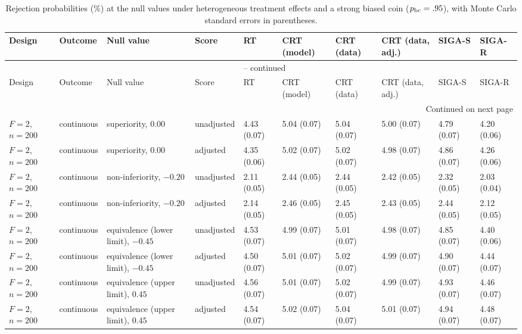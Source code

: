 \clearpage
\begin{landscape}\begin{singlespace}\begingroup\footnotesize\setlength{\tabcolsep}{2pt}\renewcommand{\arraystretch}{1.05}\setlength{\LTleft}{\fill}\setlength{\LTright}{\fill}
\begin{longtable}{@{}llllllllll@{}}
\caption{Rejection probabilities (\%) at the null values under heterogeneous treatment effects and a strong biased coin ($p_{\rm bc}=.95$), with Monte Carlo standard errors in parentheses.}
\label{tab:supp-hetero-null-stress}\\
\toprule
Design & Outcome & Null value & Score & RT & CRT (model) & CRT (data) & CRT (data, adj.) & SIGA-S & SIGA-R\\
\midrule\endfirsthead
\multicolumn{10}{c}{\tablename\ \thetable{} -- continued}\\\toprule
Design & Outcome & Null value & Score & RT & CRT (model) & CRT (data) & CRT (data, adj.) & SIGA-S & SIGA-R\\
\midrule\endhead
\midrule\multicolumn{10}{r}{Continued on next page}\\\endfoot
\bottomrule\endlastfoot
$F=2$, $n=200$ & continuous & superiority, $0.00$ & unadjusted & 4.43 (0.07) & 5.04 (0.07) & 5.04 (0.07) & 5.00 (0.07) & 4.79 (0.07) & 4.20 (0.06)\\
$F=2$, $n=200$ & continuous & superiority, $0.00$ & adjusted & 4.35 (0.06) & 5.02 (0.07) & 5.02 (0.07) & 4.98 (0.07) & 4.86 (0.07) & 4.26 (0.06)\\
$F=2$, $n=200$ & continuous & non-inferiority, $-0.20$ & unadjusted & 2.11 (0.05) & 2.44 (0.05) & 2.44 (0.05) & 2.42 (0.05) & 2.32 (0.05) & 2.03 (0.04)\\
$F=2$, $n=200$ & continuous & non-inferiority, $-0.20$ & adjusted & 2.14 (0.05) & 2.46 (0.05) & 2.45 (0.05) & 2.43 (0.05) & 2.44 (0.05) & 2.12 (0.05)\\
$F=2$, $n=200$ & continuous & equivalence (lower limit), $-0.45$ & unadjusted & 4.53 (0.07) & 4.99 (0.07) & 5.01 (0.07) & 4.98 (0.07) & 4.85 (0.07) & 4.40 (0.06)\\
$F=2$, $n=200$ & continuous & equivalence (lower limit), $-0.45$ & adjusted & 4.50 (0.07) & 5.01 (0.07) & 5.02 (0.07) & 4.99 (0.07) & 4.90 (0.07) & 4.44 (0.07)\\
$F=2$, $n=200$ & continuous & equivalence (upper limit), $0.45$ & unadjusted & 4.56 (0.07) & 5.01 (0.07) & 5.02 (0.07) & 4.99 (0.07) & 4.93 (0.07) & 4.46 (0.07)\\
$F=2$, $n=200$ & continuous & equivalence (upper limit), $0.45$ & adjusted & 4.54 (0.07) & 5.02 (0.07) & 5.04 (0.07) & 5.01 (0.07) & 4.94 (0.07) & 4.48 (0.07)\\

\end{longtable}
\end{singlespace}
\end{landscape}
